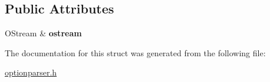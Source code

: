 \subsection*{Public Attributes}
\begin{DoxyCompactItemize}
\item 
\mbox{\label{structoption_1_1_print_usage_implementation_1_1_o_stream_writer_a9b808696e204a834acd4362c62b9f4c1}} 
O\+Stream \& {\bfseries ostream}
\end{DoxyCompactItemize}


The documentation for this struct was generated from the following file\+:\begin{DoxyCompactItemize}
\item 
\hyperlink{optionparser_8h}{optionparser.\+h}\end{DoxyCompactItemize}
